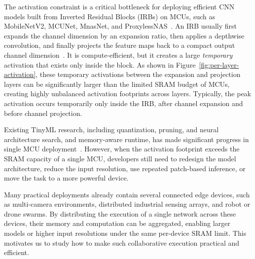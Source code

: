 The activation constraint is a critical bottleneck for deploying efficient CNN models built from Inverted Residual Blocks (IRBs) on MCUs, such as MobileNetV2, MCUNet, MnasNet, and ProxylessNAS~\cite{mobilenetv2,mcunet,mnasnet,proxylessnas}.  An IRB usually first expands the channel dimension by an expansion ratio, then applies a depthwise convolution, and finally projects the feature maps back to a compact output channel dimension~\cite{mobilenetv2}. It is compute-efficient, but it creates a large \emph{temporary} activation that exists only inside the block. As shown in Figure~\ref{fig:per-layer-activation}, these temporary activations between the expansion and projection layers can be significantly larger than the limited SRAM budget of MCUs, creating highly unbalanced activation footprints across layers. Typically, the peak activation occurs temporarily only inside the IRB, after channel expansion and before channel projection. 

Existing TinyML research, including quantization, pruning, and neural architecture search, and memory-aware runtime, has made significant progress in single MCU deployment~\cite{quantize-deepcompress,quantize-memory,prune-weights,prune-sparse,mcunet,proxylessnas}. However, when the activation footprint exceeds the SRAM capacity of a single MCU, developers still need to redesign the model architecture, reduce the input resolution, use repeated patch-based inference, or move the task to a more powerful device.   

Many practical deployments already contain several connected edge devices, such as multi-camera environments, distributed industrial sensing arrays, and robot or drone swarms. By distributing the execution of a single network across these devices, their memory and computation can be aggregated, enabling larger models or higher input resolutions under the same per-device SRAM limit. This motivates us to study how to make such collaborative execution practical and efficient.



